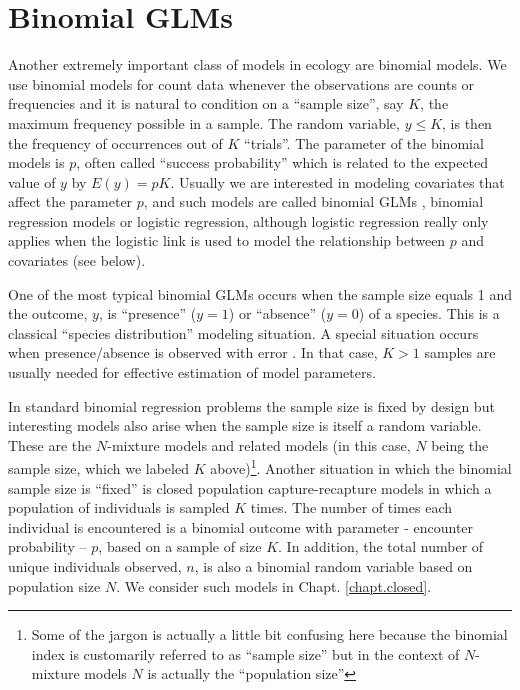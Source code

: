 \section{Binomial GLMs}

Another extremely important class of models in ecology are
binomial models. We use binomial models for count data whenever the
observations are counts or frequencies and it is natural to condition
on a ``sample size'', say $K$, the maximum frequency possible in a sample.
 The random variable, $y \le K$, is then the
frequency of occurrences out of $K$ ``trials''. The parameter of the binomial
models is $p$, often called ``success probability'' which is related
to the expected value of $y$ by $E(y) = pK$. Usually we are interested
in modeling covariates that affect the parameter $p$, and such models
are called binomial GLMs , binomial
regression models or logistic regression, although logistic regression
 really only applies when the logistic link is used to model
the relationship between $p$ and covariates (see below).

One of the most typical binomial GLMs occurs when the sample size
equals 1 and the outcome, $y$, is ``presence'' ($y=1$) or ``absence''
($y=0$) of a species. This is a classical ``species distribution''
modeling situation. A special situation occurs when presence/absence
is observed with error \citep{mackenzie_etal:2002,tyre_etal:2003}.
In that case, $K>1$ samples
are usually needed for effective estimation of model parameters.

 In standard binomial regression problems the sample size
is fixed by design but interesting models also arise when the sample
size is itself a random variable. These are the $N$-mixture models
\citep{royle:2004biom, kery_etal:2005, royle_dorazio:2008, kery:2010}
and related models (in this case, $N$ being the sample size,
which we labeled $K$ above)\footnote{Some of the jargon is actually a little
bit confusing here
because the binomial index is customarily referred to as ``sample size''
but in the context of $N$-mixture models $N$ is actually the
``population size''}.
Another
situation in which the binomial sample size is ``fixed'' is closed
population capture-recapture models in which a population of
individuals is sampled $K$ times.  The number of times each individual
is encountered is a binomial outcome with parameter - encounter
probability -- $p$, based on a sample of size $K$.  In addition, the
total number of unique individuals observed, $n$, is also a binomial
random variable based on population size $N$.  We consider such
models in Chapt. \ref{chapt.closed}.


